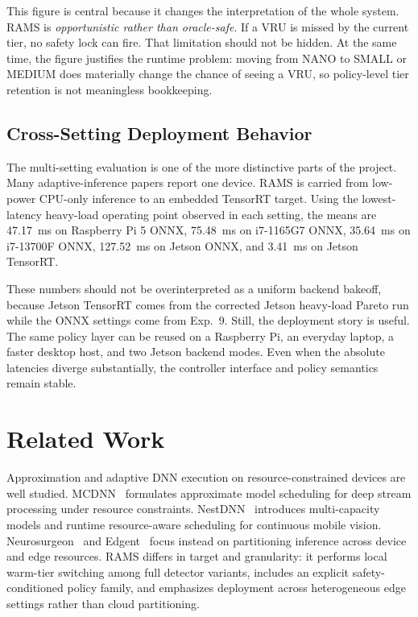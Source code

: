 \documentclass[10pt,journal]{IEEEtran}
\newcommand{\rams}{RAMS}
\begin{document}
This figure is central because it changes the interpretation of the whole system. \rams{} is \emph{opportunistic rather than oracle-safe}. If a VRU is missed by the current tier, no safety lock can fire. That limitation should not be hidden. At the same time, the figure justifies the runtime problem: moving from NANO to SMALL or MEDIUM does materially change the chance of seeing a VRU, so policy-level tier retention is not meaningless bookkeeping.

\subsection{Cross-Setting Deployment Behavior}
The multi-setting evaluation is one of the more distinctive parts of the project. Many adaptive-inference papers report one device. \rams{} is carried from low-power CPU-only inference to an embedded TensorRT target. Using the lowest-latency heavy-load operating point observed in each setting, the means are \SI{47.17}{ms} on Raspberry Pi 5 ONNX, \SI{75.48}{ms} on i7-1165G7 ONNX, \SI{35.64}{ms} on i7-13700F ONNX, \SI{127.52}{ms} on Jetson ONNX, and \SI{3.41}{ms} on Jetson TensorRT.

These numbers should not be overinterpreted as a uniform backend bakeoff, because Jetson TensorRT comes from the corrected Jetson heavy-load Pareto run while the ONNX settings come from Exp.~9. Still, the deployment story is useful. The same policy layer can be reused on a Raspberry Pi, an everyday laptop, a faster desktop host, and two Jetson backend modes. Even when the absolute latencies diverge substantially, the controller interface and policy semantics remain stable.

\section{Related Work}
Approximation and adaptive DNN execution on resource-constrained devices are well studied. MCDNN~\cite{han2016mcdnn} formulates approximate model scheduling for deep stream processing under resource constraints. NestDNN~\cite{fang2018nestdnn} introduces multi-capacity models and runtime resource-aware scheduling for continuous mobile vision. Neurosurgeon~\cite{kang2017neurosurgeon} and Edgent~\cite{li2018edgent} focus instead on partitioning inference across device and edge resources. \rams{} differs in target and granularity: it performs local warm-tier switching among full detector variants, includes an explicit safety-conditioned policy family, and emphasizes deployment across heterogeneous edge settings rather than cloud partitioning.
\end{document}
